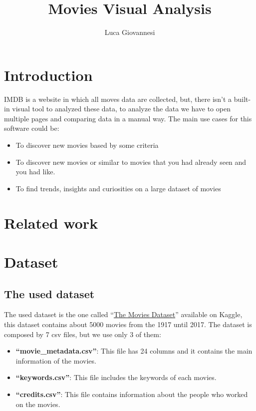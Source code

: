 \documentclass[]{article}
\title{Movies Visual Analysis}
\author{Luca Giovannesi}
\newcommand{\quotes}[1]{``#1''}
\begin{document}
\maketitle

\section{Introduction}
IMDB is a website in which all moves data are collected, but, there isn't a built-in visual tool to analyzed these data, to analyze the data we have to open multiple pages and comparing data in a manual way.\newline
The main use cases for this software could be:
\begin{itemize}
	\item To discover new movies based by some criteria
	\item To discover new movies or similar to movies that you had already seen and you had like.
	\item To find trends, insights and curiosities on a large dataset of movies
 
	
\end{itemize}
\section{Related work}
\section{Dataset}
\subsection{The used dataset}
The used dataset is the one called \quotes{\href{https://www.kaggle.com/datasets/rounakbanik/the-movies-dataset}{The Movies Dataset}} available on Kaggle, this dataset contains about 5000 movies from the 1917 until 2017.\newline
The dataset is composed by 7 csv files, but we use only 3 of them:
\begin{itemize}
	\item \textbf{\quotes{movie\_metadata.csv}}: This file has 24 columns and it contains the main information of the movies.
	\item \textbf{\quotes{keywords.csv}}: This file includes the keywords of each movies.
	\item \textbf{\quotes{credits.csv}}: This file contains information about the people who worked on the movies. 
\end{itemize}
\end{document}
